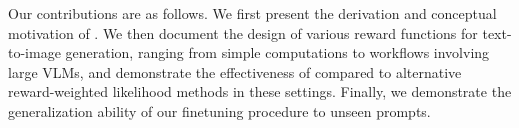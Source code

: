 Our contributions are as follows.
We first present the derivation and conceptual motivation of \methodours{}.
We then document the design of various reward functions for text-to-image generation, ranging from simple computations to workflows involving large VLMs, and demonstrate the effectiveness of \methodours{} compared to alternative reward-weighted likelihood methods in these settings.
Finally, we demonstrate the generalization ability of our finetuning procedure to unseen prompts.


